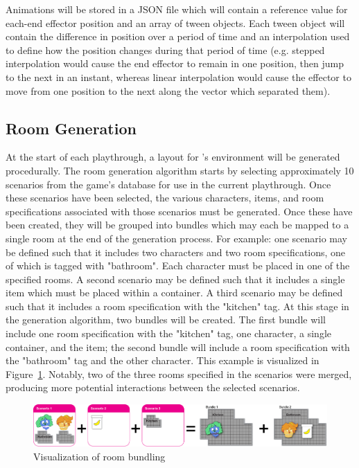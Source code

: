 Animations will be stored in a JSON file which will contain a reference value for each-end effector position and an array of tween objects. Each tween object will contain the difference in position over a period of time and an interpolation used to define how the position changes during that period of time (e.g. stepped interpolation would cause the end effector to remain in one position, then jump to the next in an instant, whereas linear interpolation would cause the effector to move from one position to the next along the vector which separated them).

\subsection{Room Generation}
At the start of each playthrough, a layout for \ourgame{}'s environment will be generated procedurally. The room generation algorithm starts by selecting approximately 10 scenarios from the game's database for use in the current playthrough. Once these scenarios have been selected, the various characters, items, and room specifications associated with those scenarios must be generated. Once these have been created, they will be grouped into bundles which may each be mapped to a single room at the end of the generation process. For example: one scenario may be defined such that it includes two characters and two room specifications, one of which is tagged with "bathroom". Each character must be placed in one of the specified rooms. A second scenario may be defined such that it includes a single item which must be placed within a container. A third scenario may be defined such that it includes a room specification with the "kitchen" tag. At this stage in the generation algorithm, two bundles will be created. The first bundle will include one room specification with the "kitchen" tag, one character, a single container, and the item; the second bundle will include a room specification with the "bathroom" tag and the other character. This example is visualized in Figure~\ref{fig:room_bundling}. Notably, two of the three rooms specified in the scenarios were merged, producing more potential interactions between the selected scenarios.

\begin{figure}[htb]
 \centering\includegraphics[width=.9\linewidth]{images/bundle}
  \caption{Visualization of room bundling}
  \label{fig:room_bundling}
\end{figure}


